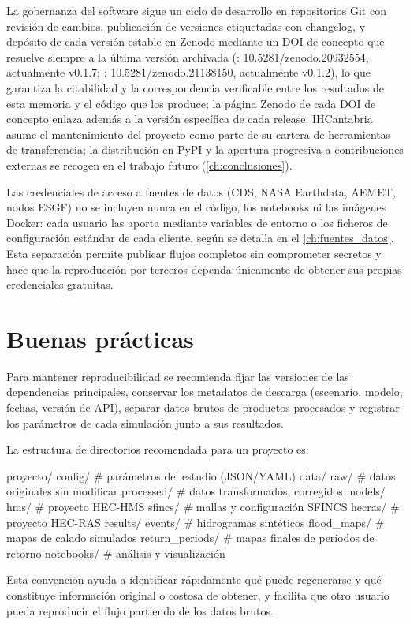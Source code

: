 La gobernanza del software sigue un ciclo de desarrollo en repositorios Git con revisión de cambios, publicación de versiones etiquetadas con changelog, y depósito de cada versión estable en Zenodo mediante un DOI de concepto que resuelve siempre a la última versión archivada (\pyhydra: 10.5281/zenodo.20932554, actualmente v0.1.7; \hydra: 10.5281/zenodo.21138150, actualmente v0.1.2), lo que garantiza la citabilidad y la correspondencia verificable entre los resultados de esta memoria y el código que los produce; la página Zenodo de cada DOI de concepto enlaza además a la versión específica de cada release. IHCantabria asume el mantenimiento del proyecto como parte de su cartera de herramientas de transferencia; la distribución en PyPI y la apertura progresiva a contribuciones externas se recogen en el trabajo futuro (\cref{ch:conclusiones}).

Las credenciales de acceso a fuentes de datos (CDS, NASA Earthdata, AEMET, nodos ESGF) no se incluyen nunca en el código, los notebooks ni las imágenes Docker: cada usuario las aporta mediante variables de entorno o los ficheros de configuración estándar de cada cliente, según se detalla en el \cref{ch:fuentes_datos}. Esta separación permite publicar flujos completos sin comprometer secretos y hace que la reproducción por terceros dependa únicamente de obtener sus propias credenciales gratuitas.

\section{Buenas prácticas}

Para mantener reproducibilidad se recomienda fijar las versiones de las dependencias principales, conservar los metadatos de descarga (escenario, modelo, fechas, versión de API), separar datos brutos de productos procesados y registrar los parámetros de cada simulación junto a sus resultados.

La estructura de directorios recomendada para un proyecto \hydra es:

\begin{codeblock}
proyecto/
  config/         # parámetros del estudio (JSON/YAML)
  data/
    raw/          # datos originales sin modificar
    processed/    # datos transformados, corregidos
  models/
    hms/          # proyecto HEC-HMS
    sfincs/       # mallas y configuración SFINCS
    hecras/       # proyecto HEC-RAS
  results/
    events/       # hidrogramas sintéticos
    flood_maps/   # mapas de calado simulados
    return_periods/ # mapas finales de períodos de retorno
  notebooks/      # análisis y visualización
\end{codeblock}

Esta convención ayuda a identificar rápidamente qué puede regenerarse y qué constituye información original o costosa de obtener, y facilita que otro usuario pueda reproducir el flujo partiendo de los datos brutos.

